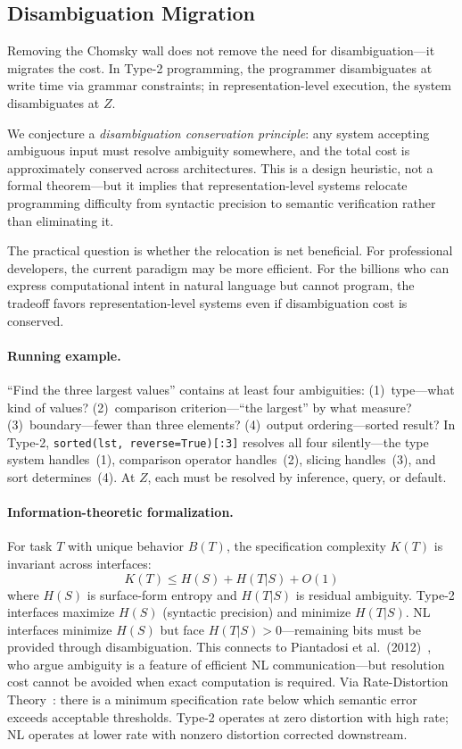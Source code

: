 \documentclass[11pt]{article}
\theoremstyle{definition}
\begin{document}
\subsection{Disambiguation Migration}\label{sec:disambiguation}

Removing the Chomsky wall does not remove the need for disambiguation---it migrates the cost. In Type-2 programming, the programmer disambiguates at write time via grammar constraints; in representation-level execution, the system disambiguates at $Z$.

We conjecture a \emph{disambiguation conservation principle}: any system accepting ambiguous input must resolve ambiguity somewhere, and the total cost is approximately conserved across architectures. This is a design heuristic, not a formal theorem---but it implies that representation-level systems relocate programming difficulty from syntactic precision to semantic verification rather than eliminating it.

The practical question is whether the relocation is net beneficial. For professional developers, the current paradigm may be more efficient. For the billions who can express computational intent in natural language but cannot program, the tradeoff favors representation-level systems even if disambiguation cost is conserved.

\paragraph{Running example.}
``Find the three largest values'' contains at least four ambiguities: (1)~type---what kind of values? (2)~comparison criterion---``the largest'' by what measure? (3)~boundary---fewer than three elements? (4)~output ordering---sorted result? In Type-2, \texttt{sorted(lst, reverse=True)[:3]} resolves all four silently---the type system handles~(1), comparison operator handles~(2), slicing handles~(3), and sort determines~(4). At $Z$, each must be resolved by inference, query, or default.

\paragraph{Information-theoretic formalization.}
For task $T$ with unique behavior $B(T)$, the specification complexity $K(T)$ is invariant across interfaces:
\begin{equation}\label{eq:conservation}
K(T) \leq H(S) + H(T|S) + O(1)
\end{equation}
where $H(S)$ is surface-form entropy and $H(T|S)$ is residual ambiguity. Type-2 interfaces maximize $H(S)$ (syntactic precision) and minimize $H(T|S)$. NL interfaces minimize $H(S)$ but face $H(T|S) > 0$---remaining bits must be provided through disambiguation. This connects to Piantadosi et al.\ (2012)~\cite{piantadosi2012ambiguity}, who argue ambiguity is a feature of efficient NL communication---but resolution cost cannot be avoided when exact computation is required. Via Rate-Distortion Theory~\cite{shannon1959coding}: there is a minimum specification rate below which semantic error exceeds acceptable thresholds. Type-2 operates at zero distortion with high rate; NL operates at lower rate with nonzero distortion corrected downstream.
\end{document}
